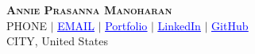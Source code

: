 \newcommand{\job}[4]{%
    \vspace{2pt}%
    \noindent\textbf{#1}\hfill #4\par
    \ifnotempty{#2}{{\small #2}\par}%
    \ifnotempty{#3}{#3\par}%
    \vspace{2pt}%
}

\newcommand{\project}[3]{%
    \vspace{1pt}%
    \noindent\textit{#1}\ifnotempty{#2}{ #2}\par
    \ifnotempty{#3}{#3\par}%
    \vspace{1pt}%
}

\newcommand{\subproject}[1]{%
    \vspace{0.5pt}%
    \noindent\textbf{#1}\par
    \vspace{-1pt}%
}

\newcommand{\sectioncontent}[1]{#1}

\providecommand{\ul}[1]{\underline{#1}}  %



\begin{center}
    \textbf{\Huge \scshape Annie Prasanna Manoharan} \\ \vspace{1pt}
    \small {{PHONE}} $|$
    \href{mailto:{{EMAIL}}}{\textcolor{blue}{\ul{{{EMAIL}}}}} $|$
    \href{{{PORTFOLIO_URL}}}{\textcolor{blue}{\ul{Portfolio}}} $|$
    \href{{{LINKEDIN_URL}}}{\textcolor{blue}{\ul{LinkedIn}}} $|$
    \href{{{GITHUB_URL}}}{\textcolor{blue}{\ul{GitHub}}} \\
    {{CITY}}, United States
\end{center}

